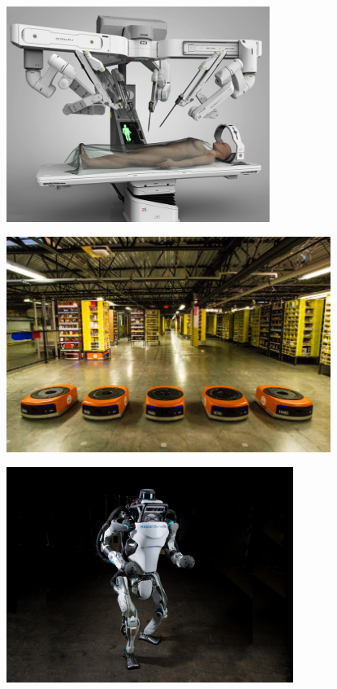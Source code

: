\begin{figure}[H]
	\centering
	\begin{minipage}[h]{.48\linewidth}
		\centering
		\includegraphics[width=.9\linewidth, height=7cm]{figures/DaVinci.jpg}
		\label{fig.DaVinci}
	\end{minipage}
	\begin{minipage}[h]{.48\linewidth}
		\centering
		\includegraphics[width=.9\linewidth, height=7cm]{figures/Amazon.jpg}
		\label{fig.Amazon}
	\end{minipage}
\end{figure}

\begin{figure}[H]
    \begin{center}
        \includegraphics[width=.7\linewidth, height=7cm]{figures/BDY_Atlas.jpg}
		\label{fig.Atlas}
    \end{center}
\end{figure}

